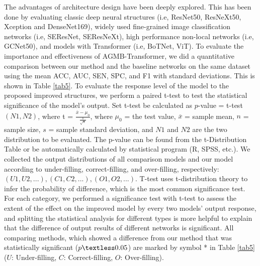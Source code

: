 \documentclass[journal]{IEEEtran}
\begin{document}
The advantages of architecture design have been deeply explored. This has been done by evaluating classic deep neural structures (i.e, ResNet50, ResNeXt50, Xception and DenseNet169), widely used fine-grained image classification networks (i.e, SEResNet, SEResNeXt), high performance non-local networks (i.e, GCNet50), and models with Transformer (i.e, BoTNet, ViT).  To evaluate the importance and effectiveness of AGMB-Transformer, we did a quantitative comparison between our method and the baseline networks on the same dataset using the mean ACC, AUC, SEN, SPC, and F1 with standard deviations. This is shown in \textcolor[rgb]{0,0.541,0.855}{Table \ref{tab5}}. To evaluate the response level of the model to the proposed improved structures, we perform a paired t-test to test the statistical significance of the model’s output. Set t-test be calculated as $p$-value = t-test $(N1, N2)$, where t = $\frac{ \overline{x}- \mu_0}{\frac{s }{ \sqrt{n} }} $, where $\mu_0$ = the test value, $\overline{x}$ = sample mean, $n$ = sample size, $s$ = sample standard deviation, and $N1$ and $N2$ are the two distribution to be evaluated. The p-value can be found from the t-Distribution Table or be automatically calculated by statistical program (R, SPSS, etc.).
We collected the output distributions of all comparison models and our model according to under-filling, correct-filling, and over-filling, respectively: $(U1, U2, ...), (C1, C2, ...), (O1, O2, ...)$. T-test uses t-distribution theory to infer the probability of difference, which is the most common significance test. For each category, we performed a significance test with t-test to assess the extent of the effect on the improved model by every two models’ output response, and splitting the statistical analysis for different types is more helpful to explain that the difference of output results of different networks is significant.
All comparing methods, which showed a difference from our method that was statistically significant ($p \textless 0.05$) are marked by symbol * in \textcolor[rgb]{0,0.541,0.855}{Table \ref{tab5}} ($U$: Under-filling, $C$: Correct-filling, $O$: Over-filling). 
\end{document}
